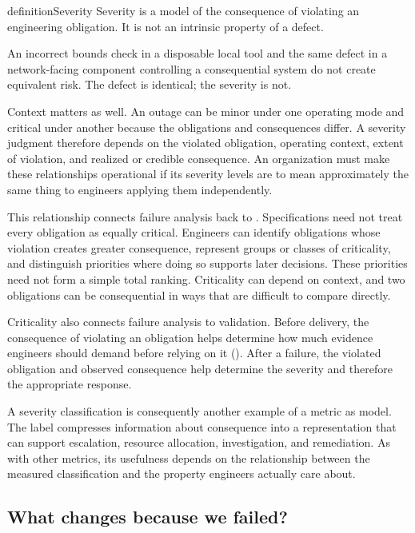 \begin{bookbox}{definition}{Severity} %
Severity is a model of the consequence of violating an engineering obligation. It is not an
intrinsic property of a defect.

An incorrect bounds check in a disposable local tool and the same defect in a network-facing
component controlling a consequential system do not create equivalent risk. The defect is
identical; the severity is not.
\end{bookbox}

Context matters as well. An outage can be minor under one operating mode and critical under another
because the obligations and consequences differ. A severity judgment therefore depends on the
violated obligation, operating context, extent of violation, and realized or credible consequence.
An organization must make these relationships operational if its severity levels are to mean
approximately the same thing to engineers applying them independently.

This relationship connects failure analysis back to \citet{ch-specification}. Specifications need not
treat every obligation as equally critical. Engineers can identify obligations whose violation
creates greater consequence, represent groups or classes of criticality, and distinguish priorities
where doing so supports later decisions. These priorities need not form a simple total ranking.
Criticality can depend on context, and two obligations can be consequential in ways that are
difficult to compare directly.

Criticality also connects failure analysis to validation. Before delivery, the consequence of
violating an obligation helps determine how much evidence engineers should demand before relying on
it (\citet{sec-consequence-evidence}). After a failure, the violated obligation and observed consequence
help determine the severity and therefore the appropriate response.

A severity classification is consequently another example of a metric as model. The label
compresses information about consequence into a representation that can support escalation,
resource allocation, investigation, and remediation. As with other metrics, its usefulness depends
on the relationship between the measured classification and the property engineers actually care
about.

\subsection{What changes because we failed?}\label{sec-what-changes}

